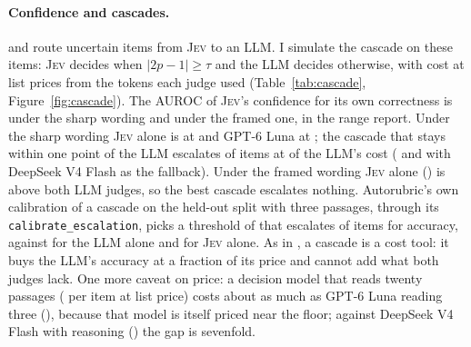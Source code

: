 \documentclass[11pt,a4paper]{article}
\newcommand{\jev}{\textsc{Jev}}
\begin{document}
\paragraph{Confidence and cascades.} \citet{li2026jevjudge} and \citet{rao2026autorubric} route uncertain items from \jev{} to an LLM. I simulate the cascade on these items: \jev{} decides when $|2p-1| \ge \tau$ and the LLM decides otherwise, with cost at list prices from the tokens each judge used (Table~\ref{tab:cascade}, Figure~\ref{fig:cascade}). The AUROC of \jev{}'s confidence for its own correctness is \confAurocSharpThree{} under the sharp wording and \confAurocFramedTwoZero{} under the framed one, in the range \citet{li2026jevjudge} report. Under the sharp wording \jev{} alone is at \jevAccSharpThree{} and GPT-6 Luna at \llmAccGptSixluna{}; the cascade that stays within one point of the LLM escalates \casEscSharpThreeGptSixluna{} of items at \casShareSharpThreeGptSixluna{} of the LLM's cost (\casEscSharpThreeDeepseekvFourflash{} and \casShareSharpThreeDeepseekvFourflash{} with DeepSeek V4 Flash as the fallback). Under the framed wording \jev{} alone (\jevAccFramedTwoZero{}) is above both LLM judges, so the best cascade escalates nothing. Autorubric's own calibration of a cascade on the held-out split with three passages, through its \texttt{calibrate\_escalation}, picks a threshold of \arCascadeThr{} that escalates \arCascadeEsc{} of items for \arCascadeAcc{} accuracy, against \arLlmAcc{} for the LLM alone and \arJevAcc{} for \jev{} alone. As in \citet{rao2026jev}, a cascade is a cost tool: it buys the LLM's accuracy at a fraction of its price and cannot add what both judges lack. One more caveat on price: a decision model that reads twenty passages (\jevCostItemFramedTwoZero{} per item at list price) costs about as much as GPT-6 Luna reading three (\llmCostGptSixluna{}), because that model is itself priced near the floor; against DeepSeek V4 Flash with reasoning (\llmCostDeepseekvFourflash{}) the gap is sevenfold.

\begin{table}[t]
\centering\small
{}
\caption{Cascades at selected confidence thresholds: items with \jev{} confidence below $\tau$ go to the LLM. Cost per item at list prices; the last column is the cascade's cost as a share of the LLM's.}
\label{tab:cascade}
\end{table}
\end{document}
